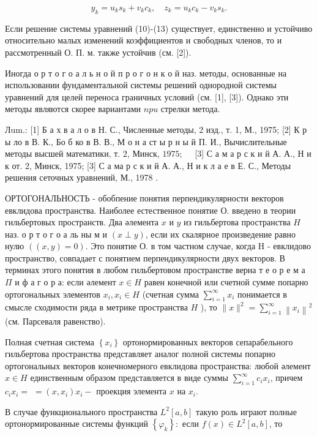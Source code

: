 \documentclass[10pt]{article}
\begin{document}
\[
y_{k}=u_{k} s_{k}+v_{k} c_{k}, \quad z_{k}=u_{k} c_{k}-v_{k} s_{k} .
\]

Если решение системы уравнений (10)-(13) существует, единственно и устойчиво относительно малых изменений коэффициентов и свободных членов, то и рассмотренный О. П. м. также устойчив (см. [2]).

Иногда о р т о г о а л ь н о й п р о г о н к о й наз. методы, основанные на использовании фундаментальной системы решений однородной системы уравнений для целей переноса граничных условий (см. [1], [3]). Однако эти методы являются скорее вариантами $n p u$ стрелки метода.

Лum.: [1] Б а х в а л о в Н. С., Численные методы, 2 изд., т. 1, М., 1975; [2] К р ы ло в В. К., Бо б ко в В. В., М о н а ст ы р н ы й П. И., Вычислительные методы высшей математики,
т. 2, Минск, $1975 ; \quad$ [3] С а м а р с к и й А. А., Н и к от. 2, Минск, 1975; [3] С а ма р с к и й А. А., Н и к
л а е в Е. С., Методы решения сеточных уравнений, М., 1978 .

ОРТОГОНАЛЬНОСТЬ - обобпение понятия перпендикулярности векторов евклидова пространства. Наиболее естественное понятие О. введено в теории гильбертовых пространств. Два әлемента $x$ и $y$ из гильбертова пространства $H$ наз. о р т о г о а ль ны м и $(x \perp y)$, если их скалярное произведение равно нулю $((x, y)=0)$. Это понятие О. в том частном случае, когда H - евклидово пространство, совпадает с понятием перпендикулярности двух векторов. В терминах этого понятия в любом гильбертовом пространстве верна т е о р е м а $\Pi$ и ф а г о р а: если әлемент $x \in H$ равен конечной или счетной сумме попарно ортогональных элементов $x_{i}, x_{i} \in H$ (счетная сумма $\sum_{i=1}^{\infty} x_{i}$ понимается в смысле сходимости ряда в метрике пространства $H$ ), то $\|x\|^{2}=\sum_{i=1}^{\infty}\left\|x_{i}\right\|^{2}$ (см. Парсеваля равенство).

Полная счетная система $\left\{x_{i}\right\}$ ортонормированных векторов сепарабельного гильбертова пространства представляет аналог полной системы попарно ортогональных векторов конечномерного евклидова пространства: любой әлемент $x \in H$ единственным образом представляется в виде суммы $\sum_{i=1}^{\infty} c_{i} x_{i}$, причем $c_{i} x_{i}=$ $=\left(x, x_{i}\right) x_{i}-$ проекция элемента $x$ на $x_{i}$.

В случае функционального пространства $L^{2}[a, b]$ такую роль играют полные ортонормированные системы функций $\left\{\varphi_{k}\right\}:$ если $f(x) \in L^{2}[a, b]$, то
\end{document}
